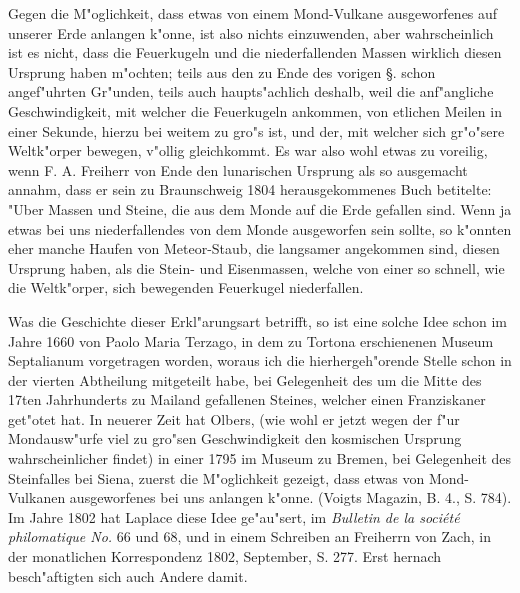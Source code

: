 \documentclass[a4paper, 11pt, oneside, polutonikogreek, german]{article}
\begin{document}
Gegen die M"oglichkeit, dass etwas von einem Mond-Vulkane ausgeworfenes auf unserer Erde anlangen k"onne, ist also nichts einzuwenden, aber wahrscheinlich ist es nicht, dass die Feuerkugeln und die niederfallenden Massen wirklich diesen Ursprung haben m"ochten; teils aus den zu Ende des vorigen §. schon angef"uhrten Gr"unden, teils auch haupts"achlich deshalb, weil die anf"angliche Geschwindigkeit, mit welcher die Feuerkugeln ankommen, von etlichen Meilen in einer Sekunde, hierzu bei weitem zu gro"s ist, und der, mit welcher sich gr"o"sere Weltk"orper bewegen, v"ollig gleichkommt. Es war also wohl etwas zu voreilig, wenn F. A. Freiherr von Ende den lunarischen Ursprung als so ausgemacht annahm, dass er sein zu Braunschweig 1804 herausgekommenes Buch betitelte: "Uber Massen und Steine, die aus dem Monde auf die Erde gefallen sind. Wenn ja etwas bei uns niederfallendes von dem Monde ausgeworfen sein sollte, so k"onnten eher manche Haufen von Meteor-Staub, die langsamer angekommen sind, diesen Ursprung haben, als die Stein- und Eisenmassen, welche von einer so schnell, wie die Weltk"orper, sich bewegenden Feuerkugel niederfallen.

Was die Geschichte dieser Erkl"arungsart betrifft, so ist eine solche Idee schon im Jahre 1660 von Paolo Maria Terzago, in dem zu Tortona erschienenen Museum Septalianum vorgetragen worden, woraus ich die hierhergeh"orende Stelle schon in der vierten Abtheilung mitgeteilt habe, bei Gelegenheit des um die Mitte des 17ten Jahrhunderts zu Mailand gefallenen Steines, welcher einen Franziskaner get"otet hat. In neuerer Zeit hat Olbers, (wie wohl er jetzt wegen der f"ur Mondausw"urfe viel zu gro"sen Geschwindigkeit den kosmischen Ursprung wahrscheinlicher findet) in einer 1795 im Museum zu Bremen, bei Gelegenheit des Steinfalles bei Siena, zuerst die M"oglichkeit gezeigt, dass etwas von Mond-Vulkanen ausgeworfenes bei uns anlangen k"onne. (Voigts Magazin, B. 4., S. 784). Im Jahre 1802 hat Laplace diese Idee ge"au"sert, im \emph{Bulletin de la société philomatique No.} 66 und 68, und in einem Schreiben an Freiherrn von Zach, in der monatlichen Korrespondenz 1802, September, S. 277. Erst hernach besch"aftigten sich auch Andere damit.
\subsection{}
\end{document}
